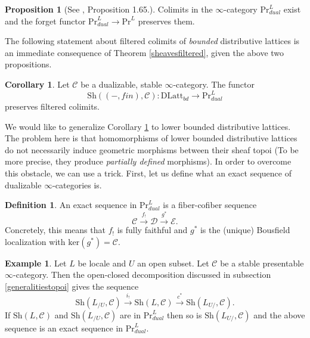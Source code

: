 \documentclass[10pt]{amsart}
\theoremstyle{definition}
\newtheorem{proposition}[theorem]{Proposition}
\newtheorem{corollary}[theorem]{Corollary}
\newtheorem{definition}[theorem]{Definition}
\newtheorem{example}[theorem]{Example}
\begin{document}
\begin{proposition}[See \cite{efimov2025ktheorylocalizinginvariantslarge},  Proposition 1.65.]
Colimits in the $\infty$-category $\mathrm{Pr}^L_{dual}$ exist and the forget functor $\mathrm{Pr}^L_{dual} \rightarrow \mathrm{Pr}^L$ preserves them.
\end{proposition}

The following statement about filtered colimits of \emph{bounded} distributive lattices is an immediate consequence of Theorem \ref{sheavesfiltered}, given the above two propositions.

\begin{corollary} \label{sheavesfiltereddualizable}
Let $\mathcal{C}$ be a dualizable, stable $\infty$-category. The functor
$$ \mathrm{Sh}((-,fin),\mathcal{C}) : \mathrm{DLatt}_{bd} \rightarrow \mathrm{Pr}^L_{dual} $$
preserves filtered colimits.
\end{corollary}

We would like to generalize Corollary \ref{sheavesfiltereddualizable} to lower bounded distributive lattices. The problem here is that homomorphisms of lower bounded distributive lattices do not necessarily induce geometric morphisms between their sheaf topoi (To be more precise, they produce \emph{partially defined} morphisms). In order to overcome this obstacle, we can use a trick. First, let us define what an exact sequence of dualizable $\infty$-categories is.

\begin{definition}
An exact sequence in $\mathrm{Pr}^L_{dual}$ is a fiber-cofiber sequence
$$ \mathcal{C} \xrightarrow{f_!} \mathcal{D} \xrightarrow{g^*} \mathcal{E}.$$
Concretely, this means that $f_!$ is fully faithful and $g^*$ is the (unique) Bousfield localization with $\mathrm{ker}(g^*) = \mathcal{C}$.
\end{definition}

\begin{example}
Let $L$ be locale and $U$ an open subset. Let $\mathcal{C}$ be a stable presentable $\infty$-category. Then the open-closed decomposition discussed in subsection \ref{generalitiestopoi} gives the sequence
$$ \mathrm{Sh}(L_{/U}, \mathcal{C}) \xrightarrow{i_!} \mathrm{Sh}(L, \mathcal{C}) \xrightarrow{c^*} \mathrm{Sh}(L_{U/}, \mathcal{C}).$$
If $\mathrm{Sh}(L, \mathcal{C})$ and $\mathrm{Sh}(L_{/U}, \mathcal{C})$ are in $\mathrm{Pr}^L_{dual}$ then so is $\mathrm{Sh}(L_{U/}, \mathcal{C})$ and the above sequence is an exact sequence in $\mathrm{Pr}^L_{dual}$.
\end{example}
\end{document}
